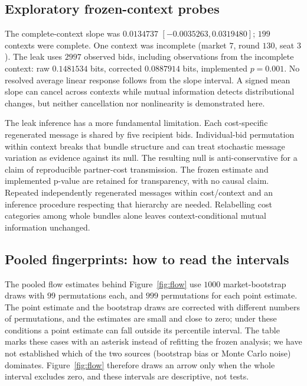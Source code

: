 \subsection{Exploratory frozen-context probes}
The complete-context slope was $0.0134737$ $[-0.0035263,0.0319480]$;
$199$ contexts were complete. One context was incomplete (market $7$,
round $130$, seat $3$). The leak uses $2997$ observed bids, including
observations from the incomplete context: raw $0.1481534$ bits, corrected
$0.0887914$ bits, implemented $p=0.001$.
No resolved average linear response follows from the slope interval.
A signed mean slope can cancel across contexts while mutual information
detects distributional changes, but neither cancellation nor nonlinearity
is demonstrated here.

The leak inference has a more fundamental limitation. Each cost-specific
regenerated message is shared by five recipient bids. Individual-bid
permutation within context breaks that bundle structure and can treat
stochastic message variation as evidence against its null. The resulting
null is anti-conservative for a claim of reproducible partner-cost
transmission. The frozen estimate and implemented p-value are retained for
transparency, with no causal claim. Repeated independently regenerated
messages within cost/context and an inference procedure respecting that
hierarchy are needed. Relabelling cost categories among whole bundles
alone leaves context-conditional mutual information unchanged.

\subsection{Pooled fingerprints: how to read the intervals}
The pooled flow estimates behind Figure~\ref{fig:flow} use $1000$
market-bootstrap draws with $99$ permutations each, and $999$ permutations
for each point estimate. The point estimate and the bootstrap draws are
corrected with different numbers of permutations, and the estimates are
small and close to zero; under these conditions a point estimate can fall
outside its percentile interval. The table marks these cases with an asterisk instead of refitting
the frozen analysis; we have not established which of the two sources
(bootstrap bias or Monte Carlo noise) dominates. Figure~\ref{fig:flow}
therefore draws an arrow only when the whole interval excludes zero, and
these intervals are descriptive, not tests.


